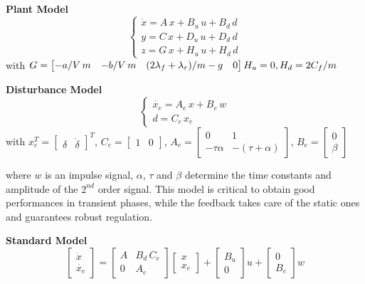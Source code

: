 \textbf{Plant Model}
\begin{equation}
\begin{cases}\dot{x}=A\,x+B_{u}\,u+B_{d}\,d\\ y=C\,x+D_{u}\,u+D_{d}\,d\\ z=G\,x+H_{u}\,u+H_{d}\,d\end{cases}
\end{equation}
with $G=\begin{bmatrix}
-{a}/{V\,m} & -{b}/{V\,m} & (2\lambda_{f}+\lambda_{r})/m - g & 0
\end{bmatrix} \\[6pt] H_{u}=0, H_{d}={2C_{f}}/{m}$

\textbf{Disturbance Model} 
\begin{equation}
\begin{cases}\dot{x_{e}}=A_{e}\,x+B_{e}\,w\\ d=C_{e}\,x_{e}\end{cases}
\end{equation}
with $x_{e}^{T}=\begin{bmatrix}
\delta & \dot{\delta}
\end{bmatrix}^{T}$, $C_{e}=\begin{bmatrix}
1 & 0
\end{bmatrix} $, $A_{e}=\begin{bmatrix}
0 & 1 \\ -\tau\alpha & -(\tau +\alpha) 
\end{bmatrix}$, $B_{e}=\begin{bmatrix}
0 \\ \beta
\end{bmatrix}$

where $w$ is an impulse signal, $\alpha$, $\tau$ and $\beta$ determine the time constants and amplitude of the $2^{nd}$ order signal. This model is critical to obtain good performances in transient phases, while the feedback takes care of the static ones and guarantees robust regulation.

\textbf{Standard Model}\\[6pt]
\[\begin{bmatrix} \dot{x} \\ \dot{x_{e}} \end{bmatrix} = \begin{bmatrix}
A & B_{d}\,C_{e} \\ 0 & A_{e}\end{bmatrix}\begin{bmatrix} x \\ x_{e} \end{bmatrix} +\begin{bmatrix} B_{u} \\ 0 \end{bmatrix} u + \begin{bmatrix}0 \\ B_{e} \end{bmatrix} w\]

